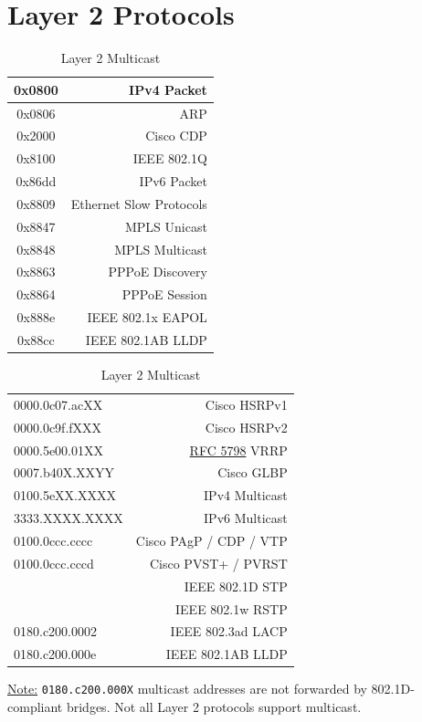 \documentclass[12pt]{article}
\newif\ifcolor											%
\newcommand{\note}[1]{\ifcolor \colorbox{#1}{Note:}\else \underline{Note:}\fi}
\newcommand{\RFC}[1]{\href{https://datatracker.ietf.org/doc/html/rfc#1}{RFC #1}}
\newcommand{\mr}[2]{\multirow{#1}{*}{#2}}
\begin{document}
\section{Layer 2 Protocols \label{sec:L2}}
	\begin{table}[H]
	\begin{minipage}[t]{.4\linewidth}
	\centering
	\caption{EtherType Values \label{tab:ETHERTYPE}}
	\begin{tabular}{| >{\ttfamily}c | r |}\hline
	0x0800	& IPv4 Packet\\\hline
	0x0806	& ARP\\\hline
	0x2000	& Cisco CDP\\\hline
	0x8100	& IEEE 802.1Q\\\hline
	0x86dd	& IPv6 Packet\\\hline
	0x8809	& Ethernet Slow Protocols\\\hline
	0x8847	& MPLS Unicast\\
	0x8848	& MPLS Multicast\\\hline
	0x8863	& PPPoE Discovery\\
	0x8864	& PPPoE Session\\\hline
	0x888e	& IEEE 802.1x EAPOL\\\hline
	0x88cc	& IEEE 802.1AB LLDP\\\hline
	\end{tabular}\end{minipage}\hfill
	\begin{minipage}[t]{.6\linewidth}
	\centering
	\caption{Layer 2 Multicast \label{tab:MULTICAST L2}}
	\begin{tabular}{| >{\ttfamily}l | r |}\hline
	0000.0c07.acXX		& Cisco HSRPv1\\
	0000.0c9f.fXXX		& Cisco HSRPv2\\\hline
	0000.5e00.01XX 		& \RFC{5798} VRRP\\\hline
	0007.b40X.XXYY		& Cisco GLBP\\\hline
	0100.5eXX.XXXX		& IPv4 Multicast\\
	3333.XXXX.XXXX		& IPv6 Multicast\\\hline
	0100.0ccc.cccc	 	& Cisco PAgP / CDP / VTP\\\hline
	0100.0ccc.cccd		& Cisco PVST+ / PVRST\\\hline
	\mr{2}{0180.c200.0000}	& IEEE 802.1D STP\\
					& IEEE 802.1w RSTP\\\hline
	0180.c200.0002		& IEEE 802.3ad LACP\\\hline
	0180.c200.000e 		& IEEE 802.1AB LLDP\\\hline
	\end{tabular}\end{minipage}\end{table}
	\note{Goldenrod} \texttt{0180.c200.000X} multicast addresses are not forwarded by 802.1D-compliant bridges. Not all Layer 2 protocols support multicast.
\end{document}
